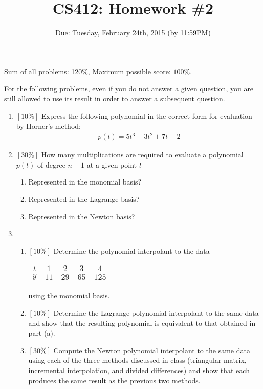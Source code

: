 \documentclass{article}
\author{}
\title{CS412: Homework \#2}
\author{Due: Tuesday, February 24th, 2015 (by 11:59PM)}
\date{}
\begin{document}
\maketitle

\noindent Sum of all problems: 120$\%$, Maximum possible score: $100\%$.
\vspace{.2in}

\noindent For the following problems, even if you do not answer a given
question, you are still allowed to use its result in order to answer a
subsequent question.

\begin{enumerate}
\item $[10\%]$
Express the following polynomial in the correct form for evaluation by Horner's
method:
\begin{eqnarray*}
p(t)=5t^3-3t^2+7t-2
\end{eqnarray*}

\item $[30\%]$ How many multiplications are required to evaluate a polynomial $p(t)$ of
degree $n-1$ at a given point $t$
\begin{enumerate}
\item
Represented in the monomial basis?
\item
Represented in the Lagrange basis?
\item
Represented in the Newton basis?
\end{enumerate}

\item
\begin{enumerate}
\item
$[10\%]$ Determine the polynomial interpolant to the data
\begin{table}[h]
\begin{center}
\begin{tabular}{ccccc}
$t$ & $1$ & $2$ & $3$ & $4$ \\
$y$ & $11$ & $29$ & $65$ & $125$
\end{tabular}
\end{center}
\end{table}

using the monomial basis.
\item
$[10\%]$ Determine the Lagrange polynomial interpolant to the same data and show that the
resulting polynomial is equivalent to that obtained in part (a).

\item
$[30\%]$ Compute the Newton polynomial interpolant to the same data using each of the
three methods discussed in class (triangular matrix, incremental interpolation,
and divided differences) and show that each produces the same result as the
previous two methods.
\end{enumerate}


\end{enumerate}
\end{document}
